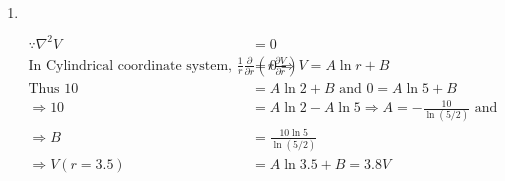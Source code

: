 \begin{enumerate}
\item $\left. \right. $
\begin{answer}
	\begin{align*}
	\because \nabla^{2} V&=0\\
	\text{In Cylindrical coordinate system, }\frac{1}{r} \frac{\partial}{\partial r}\left(r \frac{\partial V}{\partial r}\right)&=0 \Rightarrow V=A \ln r+B\\
	\text{Thus }10&=A \ln 2+B\text{ and }0=A \ln 5+B\\
	\Rightarrow 10&=A \ln 2-A \ln 5 \Rightarrow A=-\frac{10}{\ln (5 / 2)}\text{ and}\\ \Rightarrow B&=\frac{10 \ln 5}{\ln (5 / 2)}\\
	\Rightarrow V(r=3.5)&=A \ln 3.5+B=3.8 V
	\end{align*}
\end{answer}
\end{enumerate}